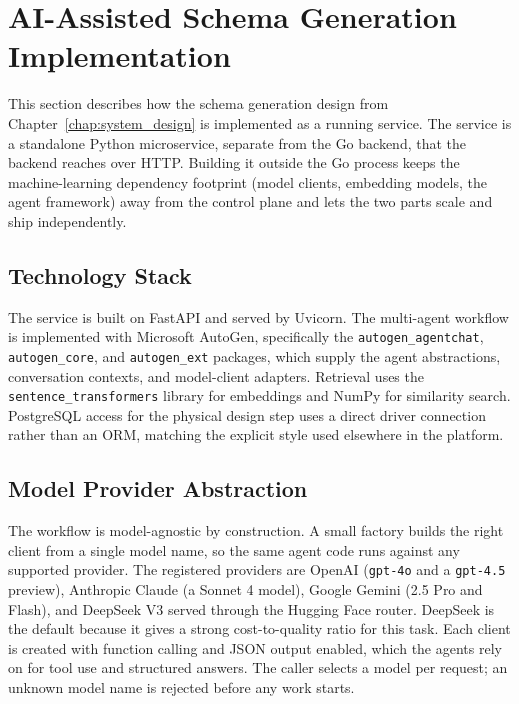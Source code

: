 \section{AI-Assisted Schema Generation Implementation}
\label{sec:schema_gen_impl}

This section describes how the schema generation design from Chapter~\ref{chap:system_design} is implemented as a running service. The service is a standalone Python microservice, separate from the Go backend, that the backend reaches over HTTP. Building it outside the Go process keeps the machine-learning dependency footprint (model clients, embedding models, the agent framework) away from the control plane and lets the two parts scale and ship independently.

\subsection{Technology Stack}

The service is built on FastAPI and served by Uvicorn. The multi-agent workflow is implemented with Microsoft AutoGen, specifically the \texttt{autogen\_agentchat}, \texttt{autogen\_core}, and \texttt{autogen\_ext} packages, which supply the agent abstractions, conversation contexts, and model-client adapters. Retrieval uses the \texttt{sentence\_transformers} library for embeddings and NumPy for similarity search. PostgreSQL access for the physical design step uses a direct driver connection rather than an ORM, matching the explicit style used elsewhere in the platform.

\subsection{Model Provider Abstraction}

The workflow is model-agnostic by construction. A small factory builds the right client from a single model name, so the same agent code runs against any supported provider. The registered providers are OpenAI (\texttt{gpt-4o} and a \texttt{gpt-4.5} preview), Anthropic Claude (a Sonnet 4 model), Google Gemini (2.5 Pro and Flash), and DeepSeek V3 served through the Hugging Face router. DeepSeek is the default because it gives a strong cost-to-quality ratio for this task. Each client is created with function calling and JSON output enabled, which the agents rely on for tool use and structured answers. The caller selects a model per request; an unknown model name is rejected before any work starts.

